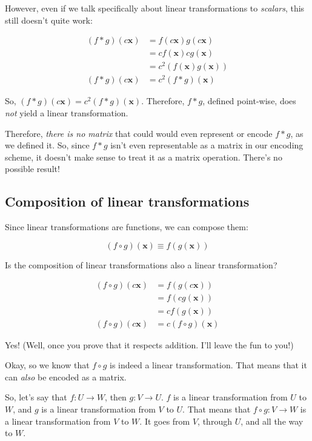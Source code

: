 \documentclass[]{article}
\begin{document}
However, even if we talk specifically about linear transformations to
\emph{scalars}, this still doesn't quite work:

\[
\begin{aligned}
(f * g)(c \mathbf{x}) & = f(c \mathbf{x}) g(c \mathbf{x}) \\
                      & = c f(\mathbf{x}) c g(\mathbf{x}) \\
                      & = c^2 ( f(\mathbf{x}) g(\mathbf{x}) ) \\
(f * g)(c \mathbf{x}) & = c^2 (f * g)(\mathbf{x})
\end{aligned}
\]

So, \((f * g)(c \mathbf{x}) = c^2 (f * g)(\mathbf{x})\). Therefore, \(f * g\),
defined point-wise, does \emph{not} yield a linear transformation.

Therefore, \emph{there is no matrix} that could would even represent or encode
\(f *
g\), as we defined it. So, since \(f * g\) isn't even representable as a matrix
in our encoding scheme, it doesn't make sense to treat it as a matrix operation.
There's no possible result!

\subsection{Composition of linear
transformations}\label{composition-of-linear-transformations}

Since linear transformations are functions, we can compose them:

\[
(f \circ g)(\mathbf{x}) \equiv f(g(\mathbf{x}))
\]

Is the composition of linear transformations also a linear transformation?

\[
\begin{aligned}
(f \circ g)(c \mathbf{x}) & = f(g(c \mathbf{x})) \\
                      & = f(c g(\mathbf{x})) \\
                      & = c f(g(\mathbf{x})) \\
(f \circ g)(c \mathbf{x}) & = c (f \circ g)(\mathbf{x})
\end{aligned}
\]

Yes! (Well, once you prove that it respects addition. I'll leave the fun to
you!)

Okay, so we know that \(f \circ g\) is indeed a linear transformation. That
means that it can \emph{also} be encoded as a matrix.

So, let's say that \(f : U \rightarrow W\), then \(g : V \rightarrow U\). \(f\)
is a linear transformation from \(U\) to \(W\), and \(g\) is a linear
transformation from \(V\) to \(U\). That means that
\(f \circ g : V \rightarrow W\) is a linear transformation from \(V\) to \(W\).
It goes from \(V\), through \(U\), and all the way to \(W\).
\end{document}
